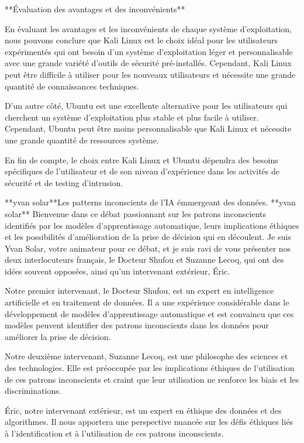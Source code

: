 **Évaluation des avantages et des inconvénients**

En évaluant les avantages et les inconvénients de chaque système d'exploitation, nous pouvons conclure que Kali Linux est le choix idéal pour les utilisateurs expérimentés qui ont besoin d'un système d'exploitation léger et personnalisable avec une grande variété d'outils de sécurité pré-installés. Cependant, Kali Linux peut être difficile à utiliser pour les nouveaux utilisateurs et nécessite une grande quantité de connaissances techniques.

D'un autre côté, Ubuntu est une excellente alternative pour les utilisateurs qui cherchent un système d'exploitation plus stable et plus facile à utiliser. Cependant, Ubuntu peut être moins personnalisable que Kali Linux et nécessite une grande quantité de ressources système.

En fin de compte, le choix entre Kali Linux et Ubuntu dépendra des besoins spécifiques de l'utilisateur et de son niveau d'expérience dans les activités de sécurité et de testing d'intrusion.


**yvan solar**Les patterns inconscients de l'IA émmergeant des données.
**yvan solar**
Bienvenue dans ce débat passionnant sur les patrons inconscients identifiés par les modèles d'apprentissage automatique, leurs implications éthiques et les possibilités d'amélioration de la prise de décision qui en découlent. Je suis Yvan Solar, votre animateur pour ce débat, et je suis ravi de vous présenter nos deux interlocuteurs français, le Docteur Shufou et Suzanne Lecoq, qui ont des idées souvent opposées, ainsi qu'un intervenant extérieur, Éric.

Notre premier intervenant, le Docteur Shufou, est un expert en intelligence artificielle et en traitement de données. Il a une expérience considérable dans le développement de modèles d'apprentissage automatique et est convaincu que ces modèles peuvent identifier des patrons inconscients dans les données pour améliorer la prise de décision.

 Notre deuxième intervenant, Suzanne Lecoq, est une philosophe des sciences et des technologies. Elle est préoccupée par les implications éthiques de l'utilisation de ces patrons inconscients et craint que leur utilisation ne renforce les biais et les discriminations.

 Éric, notre intervenant extérieur, est un expert en éthique des données et des algorithmes. Il nous apportera une perspective nuancée sur les défis éthiques liés à l'identification et à l'utilisation de ces patrons inconscients.

